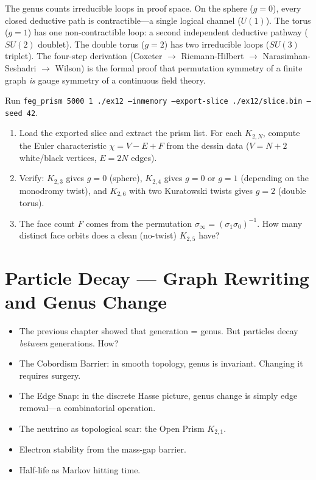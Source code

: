 \documentclass[11pt, a4paper, openany]{book}
\newenvironment{introduction}[1][Modulo Overview]{%
  \begin{tcolorbox}[
    enhanced,colback=structure!5,colframe=structure,
    colbacktitle=structure,coltitle=white,
    fonttitle=\small\bfseries,title={#1},
    arc=2pt,boxrule=0.7pt,
    left=8pt,right=8pt,top=6pt,bottom=6pt,
    before skip=12pt,after skip=12pt
  ]\itshape\begin{itemize}[leftmargin=*,itemsep=2pt,parsep=0pt]
}{%
  \end{itemize}\end{tcolorbox}
}
\begin{document}
\begin{logicalreading}
The genus counts irreducible loops in proof space. On the sphere
($g = 0$), every closed deductive path is contractible---a single
logical channel ($U(1)$). The torus ($g = 1$) has one non-contractible
loop: a second independent deductive pathway ($SU(2)$ doublet). The
double torus ($g = 2$) has two irreducible loops ($SU(3)$ triplet).
The four-step derivation (Coxeter $\to$ Riemann-Hilbert $\to$
Narasimhan-Seshadri $\to$ Wilson) is the formal proof that permutation
symmetry of a finite graph \emph{is} gauge symmetry of a continuous
field theory.
\end{logicalreading}

\begin{simulation}
Run \texttt{feg\_prism 5000 1 ./ex12 --inmemory --export-slice ./ex12/slice.bin --seed 42}.
\begin{enumerate}
\item Load the exported slice and extract the prism list. For each $K_{2,N}$, compute the Euler characteristic $\chi = V - E + F$ from the dessin data ($V = N + 2$ white/black vertices, $E = 2N$ edges).
\item Verify: $K_{2,3}$ gives $g = 0$ (sphere), $K_{2,4}$ gives $g = 0$ or $g = 1$ (depending on the monodromy twist), and $K_{2,6}$ with two Kuratowski twists gives $g = 2$ (double torus).
\item The face count $F$ comes from the permutation $\sigma_\infty = (\sigma_1 \sigma_0)^{-1}$. How many distinct face orbits does a clean (no-twist) $K_{2,5}$ have?
\end{enumerate}
\end{simulation}


\chapter{Particle Decay --- Graph Rewriting and Genus Change}\label{ch:decay}

\begin{introduction}
  \item The previous chapter showed that generation = genus. But particles
    decay \emph{between} generations. How?
  \item The Cobordism Barrier: in smooth topology, genus is invariant.
    Changing it requires surgery.
  \item The Edge Snap: in the discrete Hasse picture, genus change is
    simply edge removal---a combinatorial operation.
  \item The neutrino as topological scar: the Open Prism $K_{2,1}$.
  \item Electron stability from the mass-gap barrier.
  \item Half-life as Markov hitting time.
\end{introduction}
\end{document}
